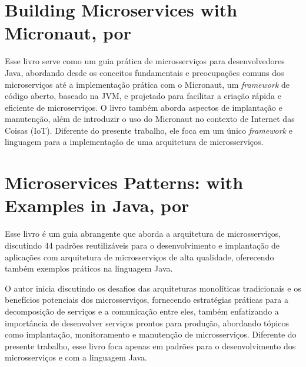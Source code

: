 \section{Building Microservices with Micronaut, por \texorpdfstring{}{Singh, Dawood e The Micronaut® Foundation (2021)}}
Esse livro serve como um guia prática de microsserviços para desenvolvedores Java, abordando desde os conceitos fundamentais e preocupações comuns dos microserviços até a implementação prática com o Micronaut, um \emph{framework} de código aberto, baseado na JVM, e projetado para facilitar a criação rápida e eficiente de microserviços. O livro também aborda aspectos de implantação e manutenção, além de introduzir o uso do Micronaut no contexto de Internet das Coisas (IoT). Diferente do presente trabalho, ele foca em um único \emph{framework} e linguagem para a implementação de uma arquitetura de microsserviços.


\section{Microservices Patterns: with Examples in Java, por \texorpdfstring{}{Richardson (2019)}}

Esse livro é um guia abrangente que aborda a arquitetura de microsserviços, discutindo 44 padrões reutilizáveis para o desenvolvimento e implantação de aplicações com arquitetura de microsserviços de alta qualidade, oferecendo também exemplos práticos na linguagem Java.

O autor inicia discutindo os desafios das arquiteturas monolíticas tradicionais e os benefícios potenciais dos microsserviços, fornecendo estratégias práticas para a decomposição de serviços e a comunicação entre eles, também enfatizando a importância de desenvolver serviços prontos para produção, abordando tópicos como implantação, monitoramento e manutenção de microsserviços. Diferente do presente trabalho, esse livro foca apenas em padrões para o desenvolvimento dos microsserviços e com a linguagem Java.

